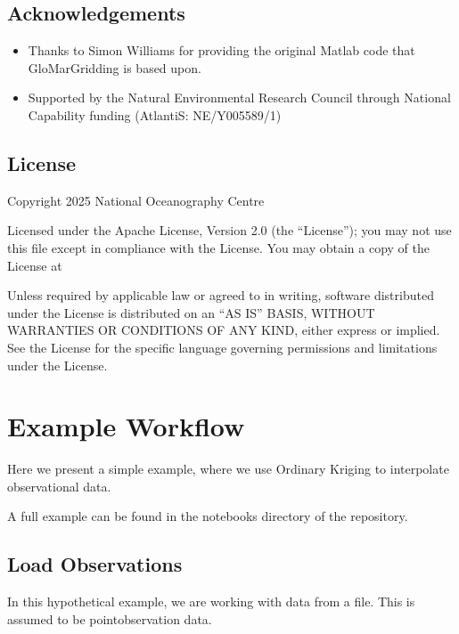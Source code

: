 \documentclass[letterpaper,10pt,english]{sphinxmanual}
\begin{document}
\section{Acknowledgements}
\label{\detokenize{authors:acknowledgements}}\begin{itemize}
\item {}
\sphinxAtStartPar
Thanks to Simon Williams for providing the original Matlab code that GloMarGridding is based upon.

\item {}
\sphinxAtStartPar
Supported by the Natural Environmental Research Council through National Capability funding
(AtlantiS: NE/Y005589/1)

\end{itemize}


\section{License}
\label{\detokenize{authors:license}}
\sphinxAtStartPar
Copyright 2025 National Oceanography Centre

\sphinxAtStartPar
Licensed under the Apache License, Version 2.0 (the “License”);
you may not use this file except in compliance with the License.
You may obtain a copy of the License at
\begin{quote}

\sphinxAtStartPar
{}
\end{quote}

\sphinxAtStartPar
Unless required by applicable law or agreed to in writing, software
distributed under the License is distributed on an “AS IS” BASIS,
WITHOUT WARRANTIES OR CONDITIONS OF ANY KIND, either express or implied.
See the License for the specific language governing permissions and
limitations under the License.

\sphinxstepscope


\chapter{Example Workflow}
\label{\detokenize{workflow:example-workflow}}\label{\detokenize{workflow::doc}}
\sphinxAtStartPar
Here we present a simple example, where we use Ordinary Kriging to interpolate observational data.

\sphinxAtStartPar
A full example can be found in the notebooks directory of the repository.


\section{Load Observations}
\label{\detokenize{workflow:load-observations}}
\sphinxAtStartPar
In this hypothetical example, we are working with data from a  file. This is assumed to be
point\sphinxhyphen{}observation data.
\end{document}
